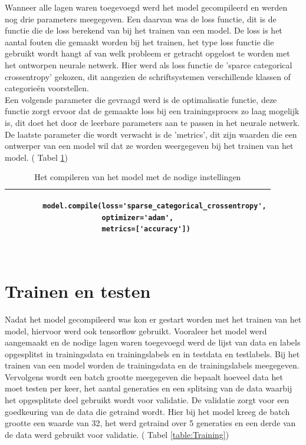 Wanneer alle lagen waren toegevoegd werd het model gecompileerd en werden nog drie parameters meegegeven.
Een daarvan was de loss functie, dit is de functie die de loss berekend van bij het trainen van een model.
De loss is het aantal fouten die gemaakt worden bij het trainen, het type loss functie die gebruikt wordt hangt af van welk probleem er getracht opgelost te worden met het ontworpen neurale netwerk.
Hier werd als loss functie de 'sparce categorical crossentropy' gekozen, dit aangezien de schriftsystemen verschillende klassen of categorieën voorstellen.\\
Een volgende parameter die gevraagd werd is de optimalisatie functie, deze functie zorgt ervoor dat de gemaakte loss bij een trainingsproces zo laag mogelijk is, dit doet het door de leerbare parameters aan te passen in het neurale netwerk.\\
De laatste parameter die wordt verwacht is de 'metrics', dit zijn waarden die een ontwerper van een model wil dat ze worden weergegeven bij het trainen van het model. ( Tabel \ref{table:Compile})


\begin{table}[!htbp]
    \begin{tabular}{|l|}
        \hline
        \begin{lstlisting}
        model.compile(loss='sparse_categorical_crossentropy',
                      optimizer='adam',
                      metrics=['accuracy'])
        
        \end{lstlisting}
        \\ \hline
    \end{tabular}
    \caption{Het compileren van het model met de nodige instellingen} \label{table:Compile}
\end{table}

\section{Trainen en testen}

Nadat het model gecompileerd was kon er gestart worden met het trainen van het model, hiervoor werd ook tensorflow gebruikt.
Vooraleer het model werd aangemaakt en de nodige lagen waren toegevoegd werd de lijst van data en labels opgesplitst in trainingsdata en trainingslabels en in testdata en testlabels.
Bij het trainen van een model worden de trainingsdata en de trainingslabels meegegeven.
Vervolgens wordt een batch grootte meegegeven die bepaalt hoeveel data het moet testen per keer, het aantal generaties en een splitsing van de data waarbij het opgesplitste deel gebruikt wordt voor validatie.
De validatie zorgt voor een goedkeuring van de data die getraind wordt.
Hier bij het model kreeg de batch grootte een waarde van 32, het werd getraind over 5 generaties en een derde van de data werd gebruikt voor validatie. ( Tabel \ref{table:Training})



